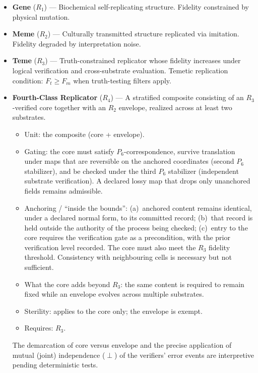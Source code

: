 \documentclass{article}
\begin{document}
\begin{itemize}
    \item \textbf{Gene} ($R_1$) --- Biochemical self-replicating structure. Fidelity
          constrained by physical mutation.
    \item \textbf{Meme} ($R_2$) --- Culturally transmitted structure replicated via
          imitation. Fidelity degraded by interpretation noise.
    \item \textbf{Teme} ($R_3$) --- Truth-constrained replicator whose fidelity
          increases under logical verification and cross-substrate evaluation.
          Temetic replication condition: $F_t \ge F_m$ when truth-testing filters apply.
    \item \textbf{Fourth-Class Replicator} ($R_4$) --- 
          A stratified composite consisting of an $R_3$-verified core together with an $R_2$ envelope, realized across at least two substrates.
          \begin{itemize}
            \item Unit: the composite (core + envelope).
            \item Gating: the core must satisfy $P_6$-correspondence, survive translation under maps that are reversible on the anchored coordinates (second $P_6$ stabilizer), and be checked under the third $P_6$ stabilizer (independent substrate verification). A declared lossy map that drops only unanchored fields remains admissible.
            \item Anchoring / ``inside the bounds'': (a)~anchored content remains identical, under a declared normal form, to its committed record; (b)~that record is held outside the authority of the process being checked; (c)~entry to the core requires the verification gate as a precondition, with the prior verification level recorded. The core must also meet the $R_3$ fidelity threshold. Consistency with neighbouring cells is necessary but not sufficient.
            \item What the core adds beyond $R_3$: the same content is required to remain fixed while an envelope evolves across multiple substrates.
            \item Sterility: applies to the core only; the envelope is exempt.
            \item Requires: $R_3$.
          \end{itemize}
          The demarcation of core versus envelope and the precise application of mutual (joint) independence ($\perp$) of the verifiers' error events are interpretive pending deterministic tests.

\end{itemize}
\end{document}
